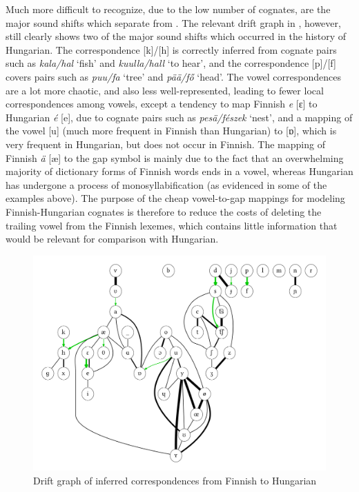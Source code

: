 Much more difficult to recognize, due to the low number of cognates, are the major sound shifts which separate  from . The relevant drift graph in , however, still clearly shows two of the major sound shifts which occurred in the history of Hungarian. The correspondence [k]/[h] is correctly inferred from cognate pairs such as \textit{kala/hal} `fish' and \textit{kuulla/hall} `to hear', and the correspondence [p]/[f] covers pairs such as \textit{puu/fa} `tree' and \textit{p\"a\"a/f\H{o}} `head'. The vowel correspondences are a lot more chaotic, and also less well-represented, leading to fewer local correspondences among vowels, except a tendency to map Finnish \textit{e} [ɛ] to Hungarian \textit{\'e} [e], due to cognate pairs such as \textit{pes\"a/f\'eszek} `nest', and a mapping of the vowel [u] (much more frequent in Finnish than Hungarian) to [ɒ], which is very frequent in Hungarian, but does not occur
in Finnish. The mapping of Finnish \textit{\"a} [æ] to the gap symbol is mainly due to the fact that an overwhelming majority of dictionary forms of Finnish words ends in a vowel, whereas Hungarian has undergone a process of monosyllabification (as evidenced in some of the examples above). The purpose of the cheap vowel-to-gap mappings for modeling Finnish-Hungarian cognates is therefore to reduce the costs of deleting the trailing vowel from the Finnish lexemes, which contains little information that would be relevant for comparison with Hungarian.

\begin{figure}
\includegraphics[width=\textwidth]{figures/drift-graph-fi-hu.pdf}
\caption{Drift graph of inferred correspondences from Finnish to Hungarian}
\label{fig:driftGraphFiHu}
\end{figure}


